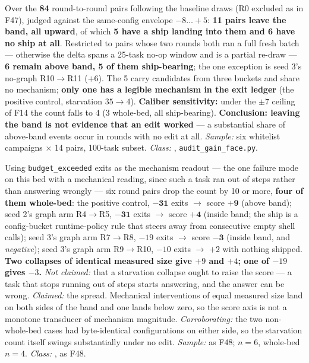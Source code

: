 \begin{description}[leftmargin=0pt,labelindent=0pt,labelsep=0pt,style=nextline,font=\normalfont,itemsep=6pt]
\item[\textbf{F48}\quad The gain face --- above-band moves across all six
      campaigns.]
Over the \textbf{84} round-to-round pairs following the baseline draws (R0
excluded as in F47), judged against the same-config envelope
$-8\ldots{+}5$: \textbf{11 pairs leave the band, all upward}, of which
\textbf{5 have a ship landing into them and 6 have no ship at all}.
Restricted to pairs whose two rounds both ran a full fresh batch ---
otherwise the delta spans a 25-task no-op window and is a partial re-draw
--- \textbf{6 remain above band, 5 of them ship-bearing}; the one
exception is seed 3's no-graph R10$\to$R11 ($+6$). The 5 carry candidates
from three buckets and share no mechanism; \textbf{only one has a legible
mechanism in the exit ledger} (the positive control, starvation $35 \to 4$).
\textbf{Caliber sensitivity:} under the $\pm 7$ ceiling of F14 the count
falls to 4 (3 whole-bed, all ship-bearing).
\textbf{Conclusion: leaving the band is not evidence that an edit worked}
--- a substantial share of above-band events occur in rounds with no edit
at all. \emph{Sample:} six whitelist campaigns $\times$ 14 pairs, 100-task
subset. \emph{Class:} , \texttt{audit\_gain\_face.py}.

\item[\textbf{F49}\quad Mechanism magnitude and score movement are
      decoupled.]
Using \texttt{budget\_exceeded} exits as the mechanism readout --- the one
failure mode on this bed with a mechanical reading, since such a task ran
out of steps rather than answering wrongly --- six round pairs drop the
count by 10 or more, \textbf{four of them whole-bed}: the positive control,
$\mathbf{-31}$ exits $\to$ score $\mathbf{+9}$ (above band); seed 2's graph
arm R4$\to$R5, $\mathbf{-31}$ exits $\to$ score $\mathbf{+4}$ (inside band;
the ship is a config-bucket runtime-policy rule that steers away from
consecutive empty shell calls); seed 3's graph arm R7$\to$R8, $-19$ exits
$\to$ score $\mathbf{-3}$ (inside band, and \emph{negative}); seed 3's
graph arm R9$\to$R10, $-10$ exits $\to$ $+2$ with nothing shipped.
\textbf{Two collapses of identical measured size give $+9$ and $+4$; one
of $-19$ gives $-3$.} \emph{Not claimed:} that a starvation collapse ought
to raise the score --- a task that stops running out of steps starts
answering, and the answer can be wrong. \emph{Claimed:} the spread. Mechanical
interventions of equal measured size land on both sides of the band and one
lands below zero, so the score axis is not a monotone transducer of
mechanism magnitude. \emph{Corroborating:} the two non-whole-bed cases had
byte-identical configurations on either side, so the starvation count
itself swings substantially under no edit. \emph{Sample:} as F48; $n=6$,
whole-bed $n=4$. \emph{Class:} , as F48.


\end{description}
